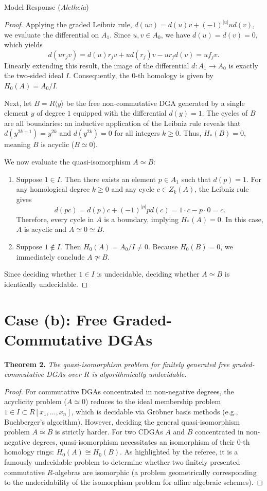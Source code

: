 \documentclass{article}
\theoremstyle{plain}
\theoremstyle{definition}
\newcommand{\Aletheia}{\emph{Aletheia}}
\begin{document}
\begin{solution}{Model Response (\Aletheia)}
\begin{proof}
Applying the graded Leibniz rule, $d(uv) = d(u)v + (-1)^{|u|}ud(v)$, we evaluate the differential on $A_1$. Since $u, v \in A_0$, we have $d(u) = d(v) = 0$, which yields
\[
d(u r_j v) = d(u)r_j v + u d(r_j) v - u r_j d(v) = u f_j v.
\]
Linearly extending this result, the image of the differential $d: A_1 \to A_0$ is exactly the two-sided ideal $I$. Consequently, the $0$-th homology is given by $H_0(A) = A_0 / I$.

Next, let $B = R\langle y \rangle$ be the free non-commutative DGA generated by a single element $y$ of degree $1$ equipped with the differential $d(y) = 1$. The cycles of $B$ are all boundaries: an inductive application of the Leibniz rule reveals that $d(y^{2k+1}) = y^{2k}$ and $d(y^{2k}) = 0$ for all integers $k \ge 0$. Thus, $H_*(B) = 0$, meaning $B$ is acyclic ($B \simeq 0$).

We now evaluate the quasi-isomorphism $A \simeq B$:
\begin{enumerate}
    \item Suppose $1 \in I$. Then there exists an element $p \in A_1$ such that $d(p) = 1$. For any homological degree $k \ge 0$ and any cycle $c \in Z_k(A)$, the Leibniz rule gives
    \[
    d(pc) = d(p)c + (-1)^{|p|} p d(c) = 1 \cdot c - p \cdot 0 = c.
    \]
    Therefore, every cycle in $A$ is a boundary, implying $H_*(A) = 0$. In this case, $A$ is acyclic and $A \simeq 0 \simeq B$.
    \item Suppose $1 \notin I$. Then $H_0(A) = A_0 / I \neq 0$. Because $H_0(B) = 0$, we immediately conclude $A \not\simeq B$.
\end{enumerate}
Since deciding whether $1 \in I$ is undecidable, deciding whether $A \simeq B$ is identically undecidable.
\end{proof}

\section*{Case (b): Free Graded-Commutative DGAs}

\textbf{Theorem 2.} \textit{The quasi-isomorphism problem for finitely generated free graded-commutative DGAs over $R$ is algorithmically undecidable.}

\begin{proof}
For commutative DGAs concentrated in non-negative degrees, the acyclicity problem ($A \simeq 0$) reduces to the ideal membership problem $1 \in I \subset R[x_1, \dots, x_n]$, which is decidable via Gröbner basis methods (e.g., Buchberger's algorithm). However, deciding the general quasi-isomorphism problem $A \simeq B$ is strictly harder. For two CDGAs $A$ and $B$ concentrated in non-negative degrees, quasi-isomorphism necessitates an isomorphism of their $0$-th homology rings: $H_0(A) \cong H_0(B)$. As highlighted by the referee, it is a famously undecidable problem to determine whether two finitely presented commutative $R$-algebras are isomorphic (a problem geometrically corresponding to the undecidability of the isomorphism problem for affine algebraic schemes).


\end{proof}
\end{solution}
\end{document}
